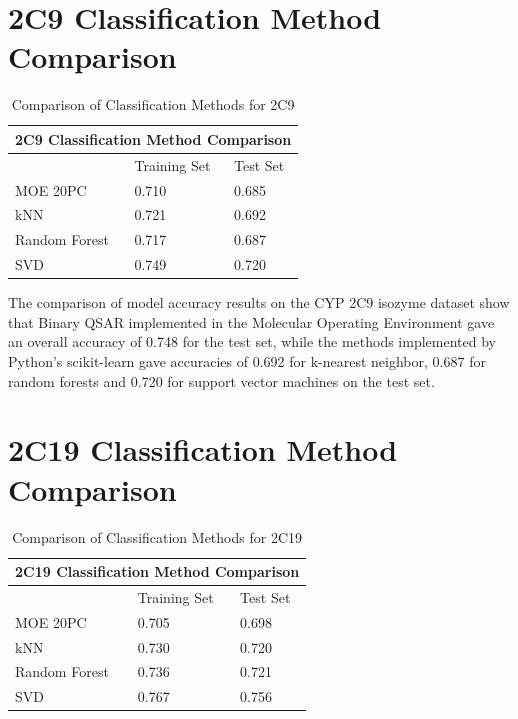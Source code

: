 \section{2C9 Classification Method Comparison}

\begin{table}[H]
\caption{Comparison of Classification Methods for 2C9}
\centering
\begin{tabular}{|l|l|l|}
\hline
\multicolumn{3}{|c|}{2C9 Classification Method Comparison} \\ \hline
          & Training Set & Test Set \\ \hline
MOE 20PC  & 0.710        & 0.685    \\ \hline
kNN       & 0.721        & 0.692    \\ \hline
Random Forest & 0.717    & 0.687    \\ \hline
SVD       & 0.749        & 0.720    \\ \hline
\end{tabular}
\end{table}

The comparison of model accuracy results on the CYP 2C9 isozyme dataset show that Binary QSAR implemented in the Molecular Operating Environment gave an overall accuracy of 0.748 for the test set, while the methods implemented by Python's scikit-learn gave accuracies of 0.692 for k-nearest neighbor, 0.687 for random forests and 0.720 for support vector machines on the test set.

\section{2C19 Classification Method Comparison}

\begin{table}[H]
\caption{Comparison of Classification Methods for 2C19}
\centering
\begin{tabular}{|l|l|l|}
\hline
\multicolumn{3}{|c|}{2C19 Classification Method Comparison} \\ \hline
          & Training Set & Test Set \\ \hline
MOE 20PC  & 0.705        & 0.698    \\ \hline
kNN       & 0.730        & 0.720    \\ \hline
Random Forest & 0.736    & 0.721    \\ \hline
SVD       & 0.767        & 0.756    \\ \hline
\end{tabular}
\end{table}

